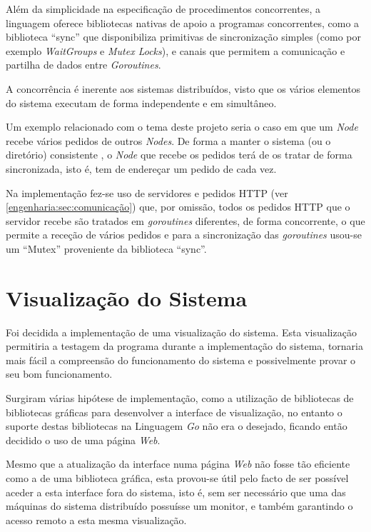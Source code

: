 Além da simplicidade na especificação de procedimentos concorrentes, a linguagem oferece bibliotecas nativas de apoio a programas concorrentes,
como a biblioteca ``sync'' que disponibiliza primitivas de sincronização simples 
(como por exemplo \emph{WaitGroups} e \emph{Mutex Locks}), e canais que permitem a comunicação e partilha de dados entre \emph{Goroutines}.

A concorrência é inerente aos sistemas distribuídos, visto que os vários elementos do sistema executam de forma independente e em simultâneo.

Um exemplo relacionado com o tema deste projeto seria o caso em que um \emph{Node} recebe vários pedidos de outros \emph{Nodes}.
De forma a manter o sistema (ou o diretório) consistente ,
o \emph{Node} que recebe os pedidos terá de os tratar de forma sincronizada, isto é, tem de endereçar um pedido de cada vez.

Na implementação fez-se uso de servidores e pedidos \acs{HTTP} (ver \ref{engenharia:sec:comunicação}) que, por omissão,
todos os pedidos \acs{HTTP} que o servidor recebe são tratados em \emph{goroutines} diferentes,
de forma concorrente, o que permite a receção de vários pedidos e 
para a sincronização das \emph{goroutines} usou-se um ``Mutex'' proveniente da biblioteca ``sync''.





\section{Visualização do Sistema}
Foi decidida a implementação de uma visualização do sistema. 
Esta visualização permitiria a testagem da programa durante a implementação do sistema,
tornaria mais fácil a compreensão do funcionamento do sistema e possivelmente provar o seu bom funcionamento.

Surgiram várias hipótese de implementação, como a utilização de bibliotecas de bibliotecas gráficas para desenvolver a interface de visualização,
no entanto o suporte destas bibliotecas na Linguagem \emph{Go} não era o desejado, ficando então decidido o uso de uma página \emph{Web}.

Mesmo que a atualização da interface numa página \emph{Web} não fosse tão eficiente como a de uma biblioteca gráfica, esta provou-se útil 
pelo facto de ser possível aceder a esta interface fora do sistema, isto é, sem ser necessário que uma das máquinas do sistema distribuído possuísse 
um monitor, e também garantindo o acesso remoto a esta mesma visualização.

